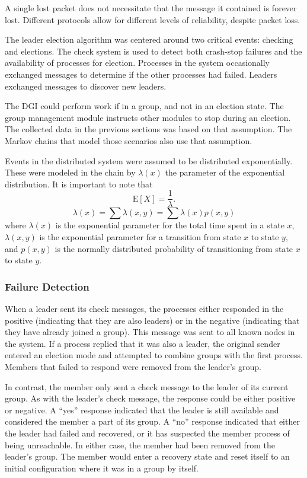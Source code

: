 A single lost packet does not necessitate that the message it contained is forever lost.
Different protocols allow for different levels of reliability, despite packet loss.

The leader election algorithm was centered around two critical events: checking and elections.
The check system is used to detect both crash-stop failures and the availability of processes for election.
Processes in the system occasionally exchanged messages to determine if the other processes had failed.
Leaders exchanged messages to discover new leaders. 

The DGI could perform work if in a group, and not in an election state. 
The group management module instructs other modules to stop during an election.
The collected data in the previous sections was based on that assumption.
The Markov chains that model those scenarios also use that assumption.

Events in the distributed system were assumed to be distributed exponentially.
These were modeled in the chain by $\lambda(x)$ the parameter of the exponential distribution. \cite{MARKOV1}\cite{MARKOV2}
It is important to note that
\begin{equation}
\mathrm{E}[X] = \frac{1}{\lambda}. \!
\end{equation}
\begin{equation}
\lambda(x) = \sum \lambda(x,y) = \sum \lambda(x) p(x,y)
\end{equation}
where $\lambda(x)$ is the exponential parameter for the total time spent in a state $x$, $\lambda(x,y)$ is the exponential parameter for a transition from state $x$ to state $y$, and $p(x,y)$ is the normally distributed probability of transitioning from state $x$ to state $y$.

\subsubsection{Failure Detection}
When a leader sent its check messages, the processes either responded in the positive (indicating that they are also leaders) or in the
negative (indicating that they have already joined a group).
This message was sent to all known nodes in the system.
If a process replied that it was also a leader, the original sender entered an election mode and attempted to combine groups with the first process.
Members that failed to respond were removed from the leader's group.

In contrast, the member only sent a check message to the leader of its current group.
As with the leader's check message, the response could be either positive or negative.
A ``yes'' response indicated that the leader is still available and considered the member a part of its group.
A ``no'' response indicated that either the leader had failed and recovered, or it has suspected the member process of being unreachable.
In either case, the member had been removed from the leader's group.
The member would enter a recovery state and reset itself to an initial configuration where it was in a group by itself.

